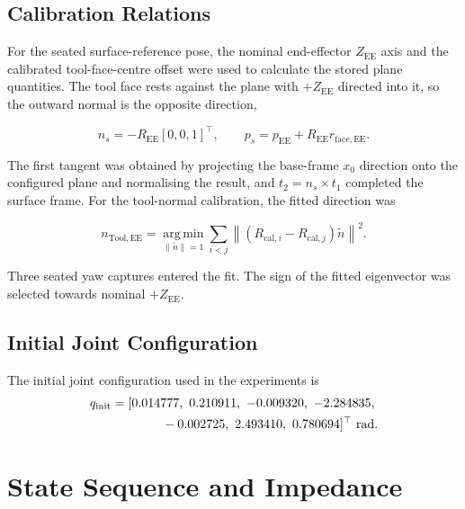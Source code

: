 \subsection{Calibration Relations}

For the seated surface-reference pose, the nominal end-effector
\mbox{\(Z_{\mathrm{EE}}\)} axis and the calibrated tool-face-centre offset
were used to calculate the stored plane quantities. The tool face rests against
the plane with \mbox{\(+Z_{\mathrm{EE}}\)} directed into it, so the outward
normal is the opposite direction,

\begin{equation}
n_s=-R_{\mathrm{EE}}[0,0,1]^\top,
\qquad
p_s=p_{\mathrm{EE}}+R_{\mathrm{EE}}r_{\mathrm{face,EE}}.
\label{eq:appendix_surface_calibration}
\end{equation}

The first tangent was obtained by projecting the base-frame
\mbox{\(x_0\)} direction onto the configured plane and normalising the
result, and
\mbox{\(t_2=n_s\times t_1\)} completed the surface frame. For the tool-normal
calibration, the fitted direction was

\begin{equation}
n_{\mathrm{Tool,EE}}
=
\operatorname*{arg\,min}_{\lVert \tilde n\rVert=1}
\sum_{i<j}
\left\lVert(R_{\mathrm{cal},i}-R_{\mathrm{cal},j})\tilde n\right\rVert^2.
\label{eq:appendix_tool_normal_fit}
\end{equation}

Three seated yaw captures entered the fit. The sign of the fitted eigenvector
was selected towards nominal \mbox{\(+Z_{\mathrm{EE}}\)}.

\subsection{Initial Joint Configuration}

The initial joint configuration used in the experiments is
\[
\begin{aligned}
q_{\mathrm{init}}={}&[
0.014777,\ 0.210911,\ -0.009320,\ -2.284835,\\
&\hspace{2.7em}-0.002725,\ 2.493410,\ 0.780694]^\top\ \mathrm{rad}.
\end{aligned}
\]

\section{State Sequence and Impedance}

